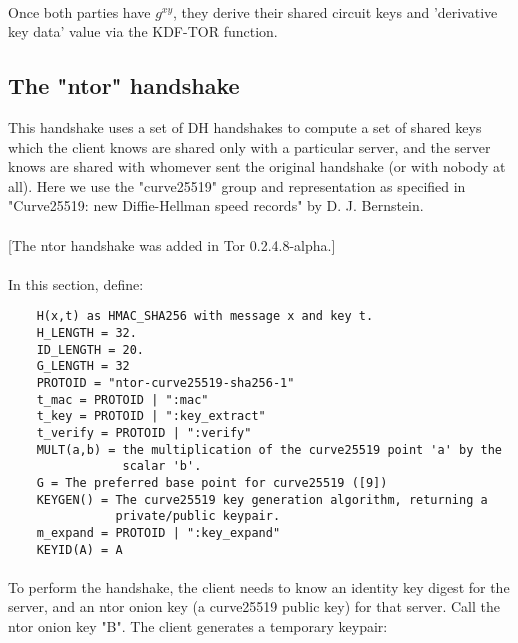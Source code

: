 \paragraph{}
Once both parties have $g^{xy}$, they derive their shared circuit keys
and 'derivative key data' value via the KDF-TOR function.

\subsection{The "ntor" handshake}
This handshake uses a set of DH handshakes to compute a set of
shared keys which the client knows are shared only with a particular
server, and the server knows are shared with whomever sent the
original handshake (or with nobody at all). Here we use the
"curve25519" group and representation as specified in "Curve25519:
new Diffie-Hellman speed records" by D. J. Bernstein.

\paragraph{}
[The ntor handshake was added in Tor 0.2.4.8-alpha.]

\paragraph{}
In this section, define:

\begin{verbatim}
    H(x,t) as HMAC_SHA256 with message x and key t.
    H_LENGTH = 32.
    ID_LENGTH = 20.
    G_LENGTH = 32
    PROTOID = "ntor-curve25519-sha256-1"
    t_mac = PROTOID | ":mac"
    t_key = PROTOID | ":key_extract"
    t_verify = PROTOID | ":verify"
    MULT(a,b) = the multiplication of the curve25519 point 'a' by the
                scalar 'b'.
    G = The preferred base point for curve25519 ([9])
    KEYGEN() = The curve25519 key generation algorithm, returning a
               private/public keypair.
    m_expand = PROTOID | ":key_expand"
    KEYID(A) = A
\end{verbatim}

\paragraph{}
To perform the handshake, the client needs to know an identity key
digest for the server, and an ntor onion key (a curve25519 public
key) for that server. Call the ntor onion key "B". The client
generates a temporary keypair:

